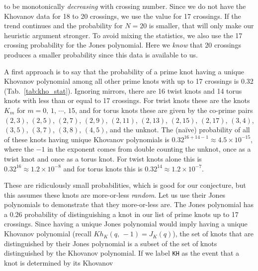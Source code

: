 \documentclass{article}
\theoremstyle{plain}
\begin{document}
        to be monotonically \textit{decreasing} with crossing number. Since
        we do not have the Khovanov data for 18 to 20 crossings, we use
        the value for 17 crossings. If the trend continues and the probability
        for $N=20$ is smaller, that will only make our heuristic argument
        stronger. To avoid mixing the statistics, we also use the 17 crossing
        probability for the Jones polynomial. Here we \textit{know} that
        20 crossings produces a smaller probability since this data is
        available to us.
        \par\hfill\par
        A first approach is to say that the probability of a prime knot having a
        unique Khovanov polynomial among all other prime
        knots with up to 17 crossings is 0.32 (Tab.~\ref{tab:kho_stat}).
        Ignoring mirrors, there are 16 twist knots and 14 torus knots with
        less than or equal to 17 crossings. For twist knots these are the knots
        $K_{m}$ for $m=0,\,1,\,\cdots,\,15$, and for torus knots these are given
        by the co-prime pairs
        $(2, 3)$, $(2, 5)$, $(2, 7)$, $(2, 9)$, $(2, 11)$, $(2, 13)$,
        $(2, 15)$, $(2, 17)$, $(3, 4)$, $(3, 5)$, $(3, 7)$, $(3, 8)$, $(4, 5)$,
        and the unknot.
        The (na\"{i}ve) probability of all of these knots having unique
        Khovanov polynomials is $0.32^{16+14-1}\approx{4.5}\times{10}^{-15}$, where
        the $-1$ in the exponent comes from double counting the unknot, once as
        a twist knot and once as a torus knot.
        For twist knots alone this is $0.32^{16}\approx{1.2}\times{10}^{-8}$ and
        for torus knots this is $0.32^{14}\approx{1.2}\times{10}^{-7}$.
        \par\hfill\par
        These are ridiculously small probabilities, which is good for our
        conjecture,
        but this assumes these knots are more-or-less \textit{random}.
        Let us use their Jones polynomials to demonstrate that they more-or-less
        are. The Jones polynomial
        has a $0.26$ probability of distinguishing a knot in our list of prime knots
        up to 17 crossings. Since having a unique Jones polynomial would imply
        having a unique Khovanov polynomial (recall $Kh_{K}(q,\,-1)=J_{K}(q)$),
        the set of knots
        that are distinguished by their Jones polynomial is a subset of the set of
        knots distinguished by the Khovanov polynomial. If we label
        \texttt{KH} as the event that a knot is determined by its Khovanov
\end{document}
